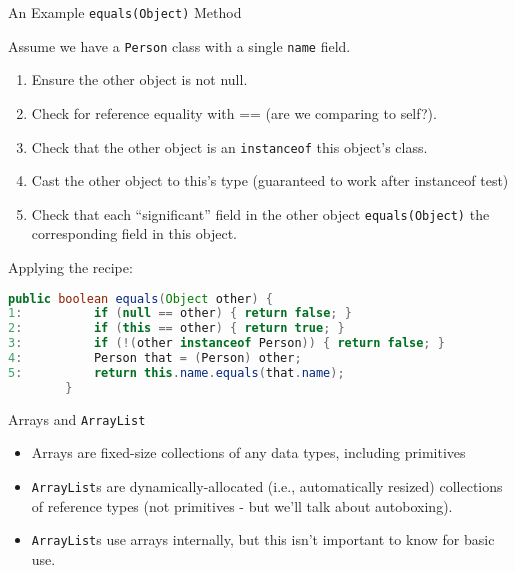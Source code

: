 \documentclass{beamer}
\begin{document}
\begin{frame}[fragile]{An Example {\tt equals(Object)} Method}

Assume we have a {\tt Person} class with a single {\tt name} field.
\begin{enumerate}
\item Ensure the other object is not null.
\item Check for reference equality with == (are we comparing to self?).
\item Check that the other object is an {\tt instanceof} this object's class.
\item Cast the other object to this's type (guaranteed to work after instanceof test)
\item Check that each ``significant'' field in the other object {\tt equals(Object)} the corresponding field in this object.
\end{enumerate}
Applying the recipe:
\begin{lstlisting}[language=Java]
        public boolean equals(Object other) {
1:          if (null == other) { return false; }
2:          if (this == other) { return true; }
3:          if (!(other instanceof Person)) { return false; }
4:          Person that = (Person) other;
5:          return this.name.equals(that.name);
        }
\end{lstlisting}

\end{frame}

\begin{frame}[fragile]{Arrays and {\tt ArrayList}}


\begin{itemize}
\item Arrays are fixed-size collections of any data types, including primitives
\item {\tt ArrayList}s are dynamically-allocated (i.e., automatically resized) collections of reference types (not primitives - but we'll talk about autoboxing).
\item {\tt ArrayList}s use arrays internally, but this isn't important to know for basic use.
\end{itemize}


\end{frame}
\end{document}
